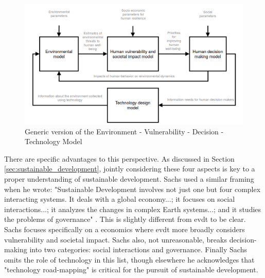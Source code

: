\begin{figure}[!htb]
    \centering
    \includegraphics[scale=0.3]{Figures/chap3/modelflow.png}
    \caption[Generic version of EVDT Model] {Generic version of the Environment - Vulnerability - Decision - Technology Model}
    \label{fig:model}
\end{figure}

There are specific advantages to this perspective. As discussed in Section \ref{sec:sustainable_development}, jointly considering these four aspects is key to a proper understanding of sustainable development. Sachs used a similar framing when he wrote: "Sustainable Development involves not just one but four complex interacting systems. It deals with a global economy...; it focuses on social interactions...; it analyzes the changes in complex Earth systems...; and it studies the problems of governance" \cite{sachsAgeSustainableDevelopment2015}. This is slightly different from \ac{evdt} to be clear. Sachs focuses specifically on a economics where \ac{evdt} more broadly considers vulnerability and societal impact. Sachs also, not unreasonable, breaks decision-making into two categories: social interactions and governance. Finally Sachs omits the role of technology in this list, though elsewhere he acknowledges that "technology road-mapping" is critical for the pursuit of sustainable development.

